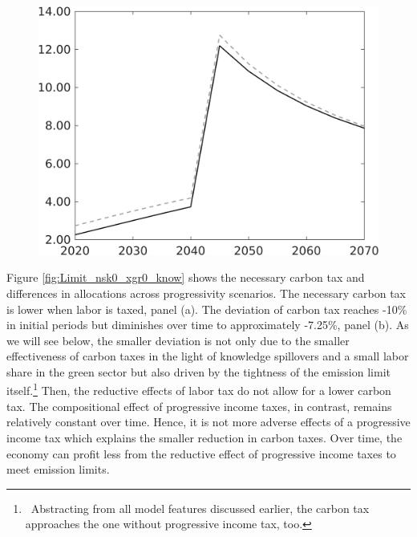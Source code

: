 \begin{figure}[h!!]
\begin{minipage}[]{0.32\textwidth}
\end{minipage}			
\begin{minipage}[]{0.32\textwidth}
\includegraphics[width=1\textwidth]{../../codding_model/own_basedOnFried/optimalPol_010922_revision/figures/all_13Sept22/CompTauf_bytaul_Reg0_gAg_spillover0_nsk0_xgr0_knspil0_sep0_LFlimit1_emsbase0_countec0_GovRev0_etaa0.79_lgd0.png}
\end{minipage}		%
 \end{figure} 
 
Figure \ref{fig:Limit_nsk0_xgr0_know} shows the necessary carbon tax and differences in allocations across progressivity scenarios. 
The necessary carbon tax is lower when labor is taxed, panel (a). The deviation of carbon tax reaches -10\% in initial periods but diminishes over time to approximately -7.25\%, panel (b).
As we will see below, the smaller deviation is not only due to the smaller effectiveness of carbon taxes in the light of knowledge spillovers and a small labor share in the green sector but also driven by the tightness of the emission limit itself.\footnote{\ Abstracting from all model features discussed earlier, the carbon tax approaches the one without progressive income tax, too. } Then, the reductive effects of labor tax do not allow for a lower carbon tax. 
 The compositional effect of progressive income taxes, in contrast, remains relatively constant over time. Hence, it is not more adverse effects of a progressive income tax which explains the smaller reduction in carbon taxes. Over time, the economy can profit less from the reductive effect of progressive income taxes to meet emission limits. 

